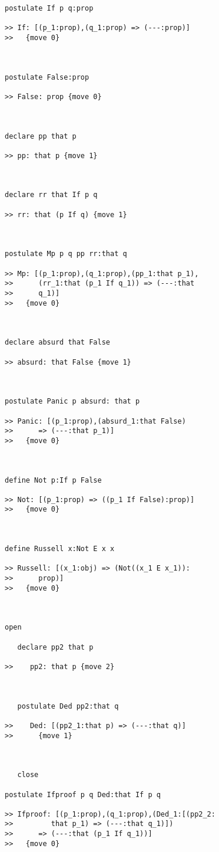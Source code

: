 \begin{verbatim}
postulate If p q:prop

>> If: [(p_1:prop),(q_1:prop) => (---:prop)]
>>   {move 0}



postulate False:prop

>> False: prop {move 0}



declare pp that p

>> pp: that p {move 1}



declare rr that If p q

>> rr: that (p If q) {move 1}



postulate Mp p q pp rr:that q

>> Mp: [(p_1:prop),(q_1:prop),(pp_1:that p_1),
>>      (rr_1:that (p_1 If q_1)) => (---:that
>>      q_1)]
>>   {move 0}



declare absurd that False

>> absurd: that False {move 1}



postulate Panic p absurd: that p

>> Panic: [(p_1:prop),(absurd_1:that False)
>>      => (---:that p_1)]
>>   {move 0}



define Not p:If p False

>> Not: [(p_1:prop) => ((p_1 If False):prop)]
>>   {move 0}



define Russell x:Not E x x

>> Russell: [(x_1:obj) => (Not((x_1 E x_1)):
>>      prop)]
>>   {move 0}



open

   declare pp2 that p

>>    pp2: that p {move 2}



   postulate Ded pp2:that q

>>    Ded: [(pp2_1:that p) => (---:that q)]
>>      {move 1}



   close

postulate Ifproof p q Ded:that If p q

>> Ifproof: [(p_1:prop),(q_1:prop),(Ded_1:[(pp2_2:
>>         that p_1) => (---:that q_1)])
>>      => (---:that (p_1 If q_1))]
>>   {move 0}




\end{verbatim}
